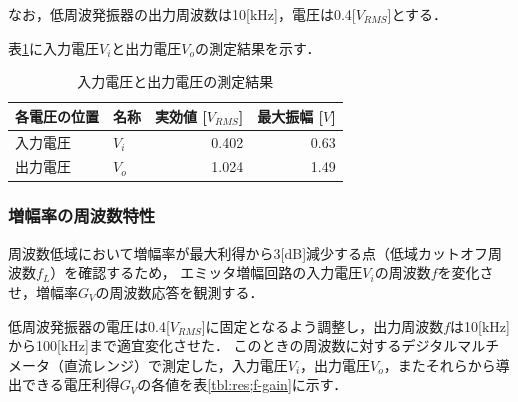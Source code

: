 \documentclass[dvipdfmx,titlepage,a4j]{jsarticle}  %
\numberwithin{equation}{section}
\begin{document}
なお，低周波発振器の出力周波数は10[kHz]，電圧は0.4[$V_{RMS}$]とする．

表\ref{tbl:res;gain}に入力電圧$V_i$と出力電圧$V_o$の測定結果を示す．
\begin{table}[H]
  \caption{入力電圧と出力電圧の測定結果}
  \begin{center}
    \begin{tabular}{l|l|r|r}
      \hline
      各電圧の位置 & 名称  & \multicolumn{1}{l|}{実効値 [$V_{RMS}$]} & \multicolumn{1}{l}{最大振幅 [$V$]} \\ \hline\hline
      入力電圧     & $V_i$ & 0.402                                   & 0.63                               \\ \hline
      出力電圧     & $V_o$ & 1.024                                   & 1.49                               \\ \hline
    \end{tabular}
  \end{center}
  \label{tbl:res;gain}
\end{table}

\subsubsection{増幅率の周波数特性}
周波数低域において増幅率が最大利得から3[dB]減少する点（低域カットオフ周波数$f_L$）を確認するため，
エミッタ増幅回路の入力電圧$V_i$の周波数$f$を変化させ，増幅率$G_V$の周波数応答を観測する．

低周波発振器の電圧は0.4[$V_{RMS}$]に固定となるよう調整し，出力周波数$f$は10[kHz]から100[kHz]まで適宜変化させた．
このときの周波数に対するデジタルマルチメータ（直流レンジ）で測定した，入力電圧$V_i$，出力電圧$V_o$，またそれらから導出できる電圧利得$G_V$の各値を表\ref{tbl:res;f-gain}に示す．
\end{document}
